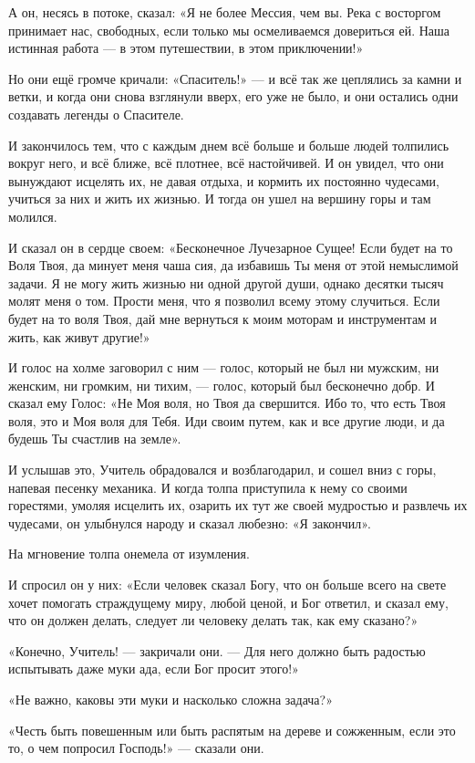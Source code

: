 А он, несясь в потоке, сказал: «Я не более Мессия, чем вы. Река с восторгом принимает нас, свободных, если только мы осмеливаемся довериться ей. Наша истинная работа --- в этом путешествии, в этом приключении!»

Но они ещё громче кричали: «Спаситель!» --- и всё так же цеплялись за камни и ветки, и когда они снова взглянули вверх, его уже не было, и они остались одни создавать легенды о Спасителе.

И закончилось тем, что с каждым днем всё больше и больше людей толпились вокруг него, и всё ближе,
всё плотнее, всё настойчивей. И он увидел, что они вынуждают исцелять их, не давая отдыха, и кормить их постоянно чудесами, учиться за них и жить их жизнью. И тогда он ушел на вершину горы и там молился.

И сказал он в сердце своем: «Бесконечное Лучезарное Сущее! Если будет на то Воля Твоя, да минует меня чаша сия, да избавишь Ты меня от этой немыслимой задачи. Я не могу жить жизнью ни одной другой души, однако десятки тысяч молят меня о том. Прости меня, что я позволил всему этому случиться. Если будет на то воля Твоя, дай мне вернуться к моим моторам и инструментам и жить, как живут другие!»

И голос на холме заговорил с ним --- голос, который не был ни мужским, ни женским, ни громким, ни тихим, --- голос, который был бесконечно добр. И сказал ему Голос: «Не Моя воля, но Твоя да свершится. Ибо то, что есть Твоя воля, это и Моя воля для Тебя. Иди своим путем, как и все другие люди, и да будешь Ты счастлив на земле».

И услышав это, Учитель обрадовался и возблагодарил, и сошел вниз с горы, напевая песенку
механика. И когда толпа приступила к нему со своими горестями, умоляя исцелить их, озарить их тут
же своей мудростью и развлечь их чудесами, он улыбнулся народу и сказал любезно: «Я закончил».

На мгновение толпа онемела от изумления.

И спросил он у них: «Если человек сказал Богу, что он больше всего на свете хочет помогать страждущему миру, любой ценой, и Бог ответил, и сказал ему, что он должен делать, следует ли человеку делать так, как ему сказано?»

«Конечно, Учитель! --- закричали они. --- Для него должно быть радостью испытывать даже муки ада, если Бог просит этого!»

«Не важно, каковы эти муки и насколько сложна задача?»

«Честь быть повешенным или быть распятым на дереве и сожженным, если это то, о чем попросил Господь!» --- сказали они.

